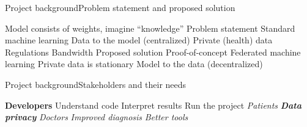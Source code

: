 
\begin{frame}{Project background}{Problem statement and proposed solution}
\begin{outline}
    \1 Model consists of weights, imagine ``knowledge''
    \vspace{0.3cm}
    \1 Problem statement
        \2 Standard machine learning
        \2 Data to the model (centralized)
        \2 Private (health) data
        \2 Regulations
        \2 Bandwidth
    \1 Proposed solution
        \2 Proof-of-concept
        \2 Federated machine learning
        \2 Private data is stationary
        \2 Model to the data (decentralized)
\end{outline}
\end{frame}

\begin{frame}{Project background}{Stakeholders and their needs}
\begin{outline}
        \1 \textbf{Developers}
            \2 Understand code
            \2 Interpret results
            \2 Run the project
        \vspace{0.5cm}
        \1 \emph{Patients}
            \2 \emph{\textbf{Data privacy}}
        \1 \emph{Doctors}
            \2 \emph{Improved diagnosis}
            \2 \emph{Better tools}
\end{outline}
\end{frame}








